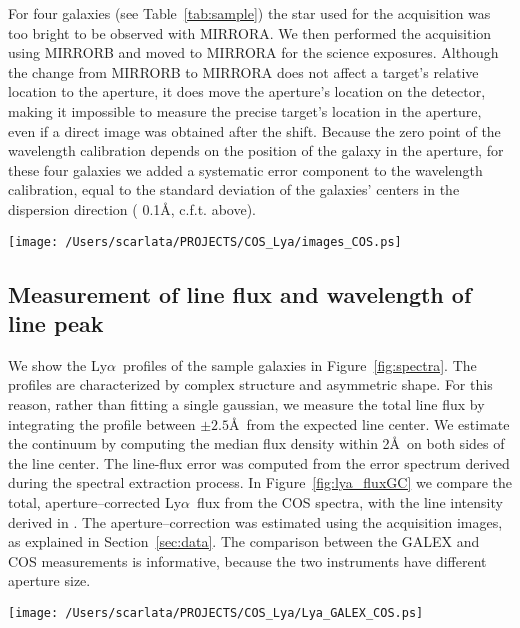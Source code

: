 \documentclass[manuscript]{emulateapj}
\newcommand{\lya}{Ly$\alpha$}
\begin{document}
For four galaxies (see Table~\ref{tab:sample}) the star used for the
acquisition was too bright to be observed with MIRRORA. We then
performed the acquisition using MIRRORB and moved to MIRRORA for the
science exposures. Although the change from MIRRORB to MIRRORA does not
affect a target’s relative location to the aperture, it does move the
aperture’s location on the detector, making it impossible to measure
the precise target's location in the aperture, even if a direct image
was obtained after the shift. Because the zero point of the wavelength
calibration depends on the position of the galaxy in the aperture, for
these four galaxies we added a systematic error component to the
wavelength calibration, equal to the standard deviation of the
galaxies' centers in the dispersion direction ( 0.1\AA, c.f.t. above).
\begin{figure*}[]
  \centering
  \texttt{[image: /Users/scarlata/PROJECTS/COS\_Lya/images\_COS.ps]}
\caption{HST NUV images of the 25 sample galaxies observed with COS. The circle shows the
 position of the COS 2 aperture on the object. For four galaxies the
 position could not be determined (see text for detail).}
  \label{fig:images}
\end{figure*}


\subsection{Measurement of line flux and wavelength of line peak}
We show the \lya\ profiles of the sample galaxies in
Figure~\ref{fig:spectra}.  The profiles are characterized by complex
structure and asymmetric shape.  For this reason, rather than fitting
a single gaussian, we measure the total line flux by integrating the
profile between $\pm 2.5$\AA\ from the expected line center. We
estimate the continuum by computing the median flux density within
2\AA\ on both sides of the line center. The line-flux error was
computed from the error spectrum derived during the spectral
extraction process.  In Figure~\ref{fig:lya_fluxGC} we compare the
total, aperture--corrected \lya\ flux from the COS spectra, with the
line intensity derived in \citet{cowie2011}. The aperture--correction
was estimated using the acquisition images, as explained in
Section~\ref{sec:data}. The comparison between the GALEX and COS
measurements is informative, because the two instruments have
different aperture size. 

\begin{figure*}[]
  \centering
  \texttt{[image: /Users/scarlata/PROJECTS/COS\_Lya/Lya\_GALEX\_COS.ps]}
  \caption{Comparison between the total \lya\ flux measured in the COS
    aperture, and the \lya\ flux measure from GALEX spectra. Large
    points have been corrected using the aperture correction estimated
    from the UV continuum. Open large squares indicate galaxies
    observed with MIRROR-B. After the aperture correction,
    approximately 30\% of the \lya\ flux is missed by the 2 COS
    aperture, indicating that the \lya\ emission is more extended than
    the continuum.}
  \label{fig:images}
\end{figure*}
\end{document}
